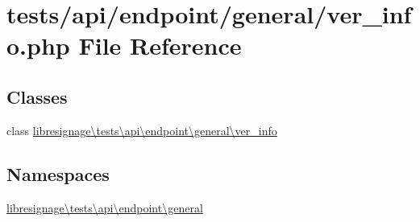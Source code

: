 \hypertarget{tests_2api_2endpoint_2general_2ver__info_8php}{}\section{tests/api/endpoint/general/ver\+\_\+info.php File Reference}
\label{tests_2api_2endpoint_2general_2ver__info_8php}
\subsection*{Classes}
\begin{DoxyCompactItemize}
\item 
class \hyperlink{classlibresignage_1_1tests_1_1api_1_1endpoint_1_1general_1_1ver__info}{libresignage\textbackslash{}tests\textbackslash{}api\textbackslash{}endpoint\textbackslash{}general\textbackslash{}ver\+\_\+info}
\end{DoxyCompactItemize}
\subsection*{Namespaces}
\begin{DoxyCompactItemize}
\item 
 \hyperlink{namespacelibresignage_1_1tests_1_1api_1_1endpoint_1_1general}{libresignage\textbackslash{}tests\textbackslash{}api\textbackslash{}endpoint\textbackslash{}general}
\end{DoxyCompactItemize}
